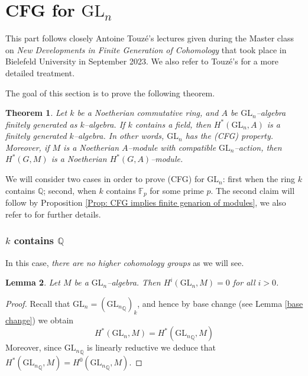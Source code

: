 \documentclass{article}
\theoremstyle{plain}
\newtheorem{Th}{Theorem}[section]
\newtheorem{Lemma}[Th]{Lemma}
\theoremstyle{definition}
\newcommand{\GL}{\mathrm{GL}}
\begin{document}
\pagebreak


\section{CFG for $\GL_n$}\label{section:CFGforGL}

This part follows closely Antoine Touz\'e's lectures given during the Master class on \textit{New Developments in Finite Generation of Cohomology} that took place in Bielefeld University in September 2023. We also refer to Touz\'e's \cite{Tou2022} for a more detailed treatment.

The goal of this section is to prove the following theorem. 

\begin{Th}\label{CFG for GLn}
    Let $k$ be a Noetherian commutative ring, and $A$ be $\GL_n$--algebra finitely generated as $k$--algebra.  If $k$ contains a field, then $H^\ast(\GL_n,A)$ is a finitely generated $k$--algebra. In other words, $\GL_n$ has the (CFG) property. Moreover, if $M$ is a Noetherian $A$--module with compatible $\GL_n$--action, then $H^\ast(G,M)$ is a Noetherian $H^\ast(G,A)$--module.
\end{Th}


We will consider two cases in order to prove (CFG) for $\GL_n$: first when the ring $k$ contains $\mathbb{Q}$; second, when $k$ contains $\mathbb{F}_p$ for some prime $p$. The second claim will follow by Proposition \ref{Prop: CFG implies finite genarion of modules}, we also refer to \cite[Theorem 1.5]{TvdK10} for further details.

\subsubsection*{$k$ contains $\mathbb{Q}$} In this case, \textit{there are no 
 higher cohomology groups} as we will see.

\begin{Lemma}\label{no cohomology in char 0}
    Let $M$ be a $\GL_n$--algebra. Then $H^i(\GL_n,M)=0$ for all $i>0$.  
\end{Lemma}

\begin{proof}
    Recall that $\GL_n=({\GL_n}_\mathbb{Q})_k$, and hence by base change (see Lemma \ref{base change}) we obtain 
    \[
    H^\ast({\GL_n},M)=H^\ast({\GL_n}_\mathbb{Q},M)
    \]
    Moreover, since ${\GL_n}_\mathbb{Q}$ is linearly reductive we deduce that $H^\ast({\GL_n}_\mathbb{Q},M)=H^0({\GL_n}_\mathbb{Q},M)$. 
\end{proof}
\end{document}
